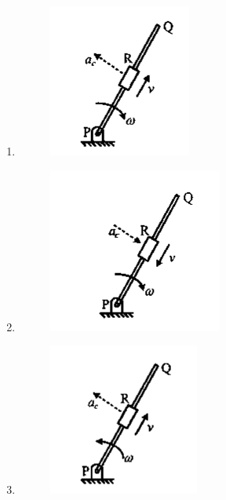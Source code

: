 \documentclass[a4paper,10pt]{article}
\begin{document}
\begin{enumerate}
\begin{multicols}{2}
\begin{enumerate}
\item \begin{figure}[H]
    \centering
    \includegraphics[width=0.5\columnwidth]{D4opt1.png}
    \caption*{}
    \label{fig:opt1}
\end{figure}
\item \begin{figure}[H]
    \centering
    \includegraphics[width=0.5\columnwidth]{D4opt2.png}
    \caption*{}
    \label{fig:opt2}
\end{figure}
\item \begin{figure}[H]
    \centering
    \includegraphics[width=0.5\columnwidth]{D4opt3.png}

\end{figure}
\end{enumerate}
\end{multicols}
\end{enumerate}
\end{document}
